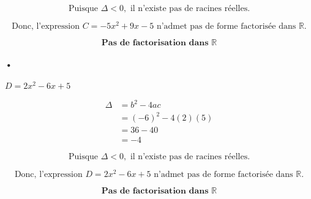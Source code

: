 \documentclass[12pt,a4paper]{article}
\begin{document}
\begin{enumerate}
\[
\text{Puisque } \Delta < 0, \text{ il n'existe pas de racines réelles.}
\]

\[
\text{Donc, l'expression } C = -5x^2 + 9x - 5 \text{ n'admet pas de forme factorisée dans } \mathbb{R}.
\]

\begin{tcolorbox}[colback=yellow!20, colframe=black, sharp corners]
    \[
    \mathbf{\text{Pas de factorisation dans } \mathbb{R}}
    \]
\end{tcolorbox}

\paragraph{•}
\(
D = 2x^2 - 6x + 5
\)

\[
\begin{aligned}
\Delta &= b^2 - 4ac \\
       &= (-6)^2 - 4(2)(5) \\
       &= 36 - 40 \\
       &= -4
\end{aligned}
\]

\[
\text{Puisque } \Delta < 0, \text{ il n'existe pas de racines réelles.}
\]

\[
\text{Donc, l'expression } D = 2x^2 - 6x + 5 \text{ n'admet pas de forme factorisée dans } \mathbb{R}.
\]

\begin{tcolorbox}[colback=yellow!20, colframe=black, sharp corners]
    \[
    \mathbf{\text{Pas de factorisation dans } \mathbb{R}}
    \]
\end{tcolorbox}

\end{enumerate}
\end{document}
